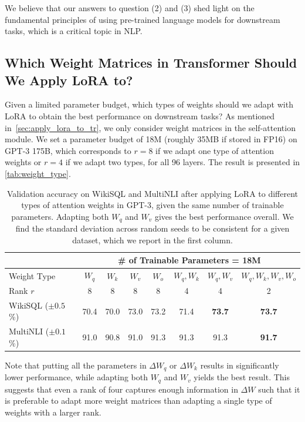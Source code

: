 \documentclass{article} %
\begin{document}
We believe that our answers to question (2) and (3) shed light on the fundamental principles of using pre-trained language models for downstream tasks, which is a critical topic in NLP.



\subsection{Which Weight Matrices in Transformer Should We Apply LoRA to?}
\label{sec:weight_types}
Given a limited parameter budget, which types of weights should we adapt with LoRA to obtain the best performance on downstream tasks?
As mentioned in~\autoref{sec:apply_lora_to_tr}, we only consider weight matrices in the self-attention module.
We set a parameter budget of 18M (roughly 35MB if stored in FP16) on GPT-3 175B, which corresponds to $r=8$ if we adapt one type of attention weights or $r=4$ if we adapt two types, for all 96 layers.
The result is presented in \autoref{tab:weight_type}.

\begin{table}[h]
  \centering
  \begin{tabular}{l|ccccccc}
  \hline
  \toprule
                & \multicolumn{7}{c}{\# of Trainable Parameters = 18M} \\
  \midrule
  Weight Type           & $W_q$  & $W_k$  & $W_v$  & $W_o$      & $W_q,W_k$     & $W_q,W_v$     & $W_q, W_k, W_v, W_o$      \\
  Rank $r$              & 8      &  8     &  8     &   8        &   4           &   4           &   2                       \\
  \midrule
  WikiSQL ($\pm0.5$\%)  & 70.4   & 70.0   & 73.0   & 73.2       & 71.4          & \textbf{73.7} & \textbf{73.7}             \\
  MultiNLI ($\pm0.1$\%) & 91.0   & 90.8   & 91.0   & 91.3       & 91.3          & 91.3          & \textbf{91.7}              \\
  \bottomrule
  \end{tabular}
  \caption{Validation accuracy on WikiSQL and MultiNLI after applying LoRA to different types of attention weights in GPT-3, given the same number of trainable parameters. Adapting both $W_q$ and $W_v$ gives the best performance overall. We find the standard deviation across random seeds to be consistent for a given dataset, which we report in the first column.}
  \label{tab:weight_type}
\end{table}

Note that putting all the parameters in $\Delta W_q$ or $\Delta W_k$ results in significantly lower performance, while adapting both $W_q$ and $W_v$ yields the best result.
This suggests that even a rank of four captures enough information in $\Delta W$ such that it is preferable to adapt more weight matrices than adapting a single type of weights with a larger rank.
\end{document}
